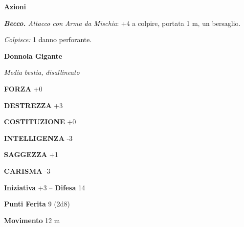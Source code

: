 \begin{multicols}{2}
\textbf{Azioni}

\textit{\textbf{Becco.} Attacco con Arma da Mischia}: +4 a colpire, portata 1 m, un bersaglio.

\textit{Colpisce:} 1 danno perforante.




















\medskip\textbf{Donnola Gigante}

\textit{Media bestia, disallineato}

\textbf{FORZA} +0

\textbf{DESTREZZA} +3

\textbf{COSTITUZIONE} +0

\textbf{INTELLIGENZA} -3

\textbf{SAGGEZZA} +1

\textbf{CARISMA} -3

\textbf{Iniziativa} +3 -- \textbf{Difesa} 14

\textbf{Punti Ferita} 9 (2d8)

\textbf{Movimento} 12 m


\end{multicols}
